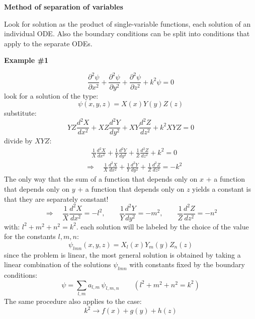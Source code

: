 \documentclass{article}
\begin{document}
\vspace{3mm}\noindent
\textbf{Method of separation of variables}

\noindent
Look for solution as the product of single-variable functions, each solution of an individual ODE. Also the boundary conditions can be split into conditions that apply to the separate ODEs.

\vspace{4mm}\noindent
\textbf{Example \#1}

\begin{equation}
    \frac{\partial^2 \psi}{\partial x^2}
+ \frac{\partial^2 \psi}{\partial y^2}
+ \frac{\partial^2 \psi}{\partial z^2}
+ k^2 \psi = 0
\end{equation}
look for a solution of the type:
\begin{equation}
    \psi(x,y,z) = X(x) Y(y)Z(z)
\end{equation}
substitute:
\begin{equation}
    YZ \frac{d^2 X}{d x^2}
+ XZ \frac{d^2 Y}{d y^2}
+ XY \frac{d^2 Z}{d z^2}
+ k^2 XYZ = 0
\end{equation}
divide by $XYZ$:
\begin{align}
    & \ \ \ \ \frac{1}{X} \frac{d^2 X}{d x^2}
+ \frac{1}{Y} \frac{d^2 Y}{d y^2}
+ \frac{1}{Z} \frac{d^2 Z}{d z^2}
+ k^2 = 0\\
&\Rightarrow \quad
\frac{1}{X} \frac{d^2 X}{d x^2}
+ \frac{1}{Y} \frac{d^2 Y}{d y^2}
+ \frac{1}{Z} \frac{d^2 Z}{d z^2}
= -k^2
\end{align}
The only way that the sum of a function that depends only on $x$ + a function that depends only on $y$ + a function that depends only on $z$ yields a constant is that they are separately constant!
\begin{equation}
    \Rightarrow \quad
\frac{1}{X} \frac{d^2 X}{d x^2} = -l^2, \qquad
\frac{1}{Y} \frac{d^2 Y}{d y^2} = -m^2, \qquad
\frac{1}{Z} \frac{d^2 Z}{d z^2} = -n^2
\end{equation}
with: $l^2 + m^2 + n^2 = k^2$. each solution will be labeled by the choice of the value for the constants $l, m, n$:
\begin{equation}
    \psi_{lmn} (x,y,z) = X_l (x) Y_m (y) Z_n (z)
\end{equation}
since the problem is linear, the most general solution is obtained by taking a linear combination of the solutions $\psi_{lmn}$ with constants fixed by the boundary conditions:
\begin{equation}
    \psi = \sum_{l, m} a_{l, m} \, \psi_{l, m, n}
\qquad \left( l^2 + m^2 + n^2 = k^2 \right)
\end{equation}
The same procedure also applies to the case:
\begin{equation}
    k^2 \rightarrow f(x) +g(y) + h(z)
\end{equation}
\end{document}
